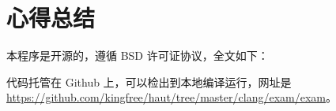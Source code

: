 \section{心得总结}

本程序是开源的，遵循 BSD 许可证协议，全文如下：
\begin{quote}
\fontsize{8pt}{8pt}

\end{quote}

代码托管在 Github 上，可以检出到本地编译运行，网址是 \url{https://github.com/kingfree/haut/tree/master/clang/exam/exam}。
